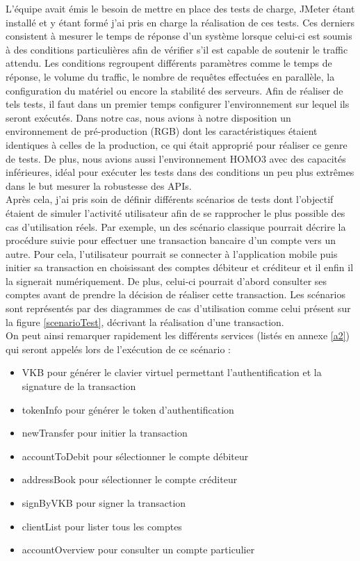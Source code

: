 	L'équipe avait émis le besoin de mettre en place des tests de charge, JMeter étant installé et y étant formé j'ai pris en charge la réalisation de ces tests. Ces derniers consistent à mesurer le temps de réponse d'un système lorsque celui-ci est soumis à des conditions particulières afin de vérifier s'il est capable de soutenir le traffic attendu. Les conditions regroupent différents paramètres comme le temps de réponse, le volume du traffic, le nombre de requêtes effectuées en parallèle, la configuration du matériel ou encore la stabilité des serveurs. Afin de réaliser de tels tests, il faut dans un premier temps configurer l'environnement sur lequel ils seront exécutés. Dans notre cas, nous avions à notre disposition un environnement de pré-production (RGB) dont les caractéristiques étaient identiques à celles de la production, ce qui était approprié pour réaliser ce genre de tests. De plus, nous avions aussi l'environnement HOMO3 avec des capacités inférieures, idéal pour exécuter les tests dans des conditions un peu plus extrêmes dans le but mesurer la robustesse des APIs. \\
	
	Après cela, j'ai pris soin de définir différents scénarios de tests dont l'objectif étaient de simuler l'activité utilisateur afin de se rapprocher le plus possible des cas d'utilisation réels. Par exemple, un des scénario classique pourrait décrire la procédure suivie pour effectuer une transaction bancaire d'un compte vers un autre. Pour cela, l'utilisateur pourrait se connecter à l'application mobile puis initier sa transaction en choisissant des comptes débiteur et créditeur et il enfin il la signerait numériquement. De plus, celui-ci pourrait d'abord consulter ses comptes avant de prendre la décision de réaliser cette transaction. Les scénarios sont représentés par des diagrammes de cas d'utilisation comme celui présent sur la figure \ref{scenarioTest}, décrivant la réalisation d'une transaction. \\

	On peut ainsi remarquer rapidement les différents services (listés en annexe \ref{a2}) qui seront appelés lors de l'exécution de ce scénario :
	\begin{itemize}
		\item VKB pour générer le clavier virtuel permettant l'authentification et la signature de la transaction
		\item tokenInfo pour générer le token d'authentification
		\item newTransfer pour initier la transaction
		\item accountToDebit pour sélectionner le compte débiteur
		\item addressBook pour sélectionner le compte créditeur
		\item signByVKB pour signer la transaction
		\item clientList pour lister tous les comptes
		\item accountOverview pour consulter un compte particulier \\
	\end{itemize}
	
